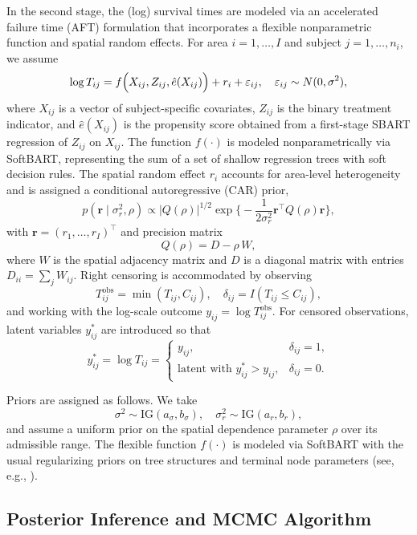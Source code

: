 \documentclass[useAMS,referee]{biom}
\begin{document}
In the second stage, the (log) survival times are modeled via an accelerated failure time (AFT) formulation that incorporates a flexible nonparametric function and spatial random effects. For area \( i=1,\ldots,I \) and subject \( j=1,\ldots,n_i \), we assume
\begin{equation} \label{eq:aftmodel}
\log T_{ij} = f\Bigl(X_{ij}, Z_{ij}, \hat{e}(X_{ij})\Bigr) + r_i + \varepsilon_{ij}, \quad \varepsilon_{ij}\sim N(0,\sigma^2),
\end{equation}
where \(X_{ij}\) is a vector of subject-specific covariates, \(Z_{ij}\) is the binary treatment indicator, and \(\hat{e}(X_{ij})\) is the propensity score obtained from a first-stage SBART regression of \(Z_{ij}\) on \(X_{ij}\). The function \(f(\cdot)\) is modeled nonparametrically via SoftBART, representing the sum of a set of shallow regression trees with soft decision rules. The spatial random effect \(r_i\) accounts for area-level heterogeneity and is assigned a conditional autoregressive (CAR) prior,
\begin{equation} \label{eq:carprior}
p(\bm{r}\mid\sigma_r^2,\rho) \propto \vert Q(\rho)\vert^{1/2} \exp\Biggl\{-\frac{1}{2\sigma_r^2}\bm{r}^\top Q(\rho)\bm{r}\Biggr\},
\end{equation}
with \(\bm{r}=(r_1,\ldots,r_I)^\top\) and precision matrix
\[
Q(\rho)=D-\rho\,W,
\]
where \(W\) is the spatial adjacency matrix and \(D\) is a diagonal matrix with entries \(D_{ii}=\sum_jW_{ij}\). Right censoring is accommodated by observing
\[
T_{ij}^{\mathrm{obs}} = \min(T_{ij}, C_{ij}), \quad \delta_{ij}=I(T_{ij}\le C_{ij}),
\]
and working with the log-scale outcome \(y_{ij}=\log T_{ij}^{\mathrm{obs}}\). For censored observations, latent variables \(y_{ij}^\ast\) are introduced so that
\[
y_{ij}^\ast = \log T_{ij} = 
\begin{cases}
y_{ij}, & \delta_{ij}=1,\\[1mm]
\text{latent with } y_{ij}^\ast > y_{ij}, & \delta_{ij}=0.
\end{cases}
\]

Priors are assigned as follows. We take
\[
\sigma^2 \sim \mathrm{IG}(a_\sigma,b_\sigma),\quad \sigma_r^2 \sim \mathrm{IG}(a_r,b_r),
\]
and assume a uniform prior on the spatial dependence parameter \(\rho\) over its admissible range. The flexible function \(f(\cdot)\) is modeled via SoftBART with the usual regularizing priors on tree structures and terminal node parameters (see, e.g., \cite{Chipman10}).

\subsection{Posterior Inference and MCMC Algorithm}
\end{document}
